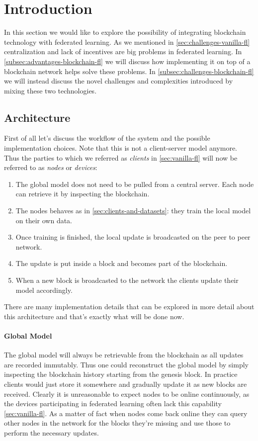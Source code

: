 \section{Introduction}\label{sec:blockchain-fl}
In this section we would like to explore the possibility of integrating blockchain technology with federated learning.
As we mentioned in \ref{sec:challenges-vanilla-fl} centralization and lack of incentives are big problems in
federated learning. In \ref{subsec:advantages-blockchain-fl} we will discuss how implementing it on top of a
blockchain network helps solve these problems. In \ref{subsec:challenges-blockchain-fl} we will instead discuss
the novel challenges and complexities introduced by mixing these two technologies.

\subsection{Architecture}
First of all let's discuss the workflow of the system and the possible implementation choices.
Note that this is not a client-server model anymore. Thus the parties to which we referred as
\textit{clients} in \ref{sec:vanilla-fl} will now be referred to as \textit{nodes} or \textit{devices}:
\begin{enumerate}
  \item The global model does not need to be pulled from a central server.
    Each node can retrieve it by inspecting the blockchain.
  \item The nodes behaves as in \ref{sec:clients-and-datasets}: they train the local model on their own data.
  \item Once training is finished, the local update is broadcasted on the peer to peer network.
  \item The update is put inside a block and becomes part of the blockchain.
  \item When a new block is broadcasted to the network the clients update their model accordingly.
\end{enumerate}

There are many implementation details that can be explored in more detail about this architecture and that's
exactly what will be done now.

\paragraph{Global Model} The global model will always be retrievable from the blockchain as all updates are
recorded immutably.
Thus one could reconstruct the global model by simply inspecting the blockchain history starting from the genesis block.
In practice clients would just store it somewhere and gradually update it as new blocks are received.
Clearly it is unreasonable to expect nodes to be online continuously, as the devices participating in
federated learning often lack this capability \ref{sec:vanilla-fl}.
As a matter of fact when nodes come back online they can query other nodes in the network for the blocks
they're missing and use those to perform the necessary updates.

